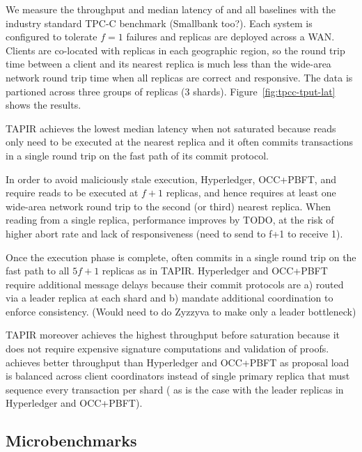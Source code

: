 We measure the throughput and median latency of \sys{} and all baselines with the
industry standard TPC-C benchmark (Smallbank too?). Each system is configured to tolerate $f=1$
failures and replicas are deployed across a WAN. Clients are co-located with
replicas in each geographic region, so the round trip time between a client and
its nearest replica is much less than the wide-area network round trip time when
all replicas are correct and responsive. The data is partioned across
three groups of replicas (3 shards). Figure~\ref{fig:tpcc-tput-lat} shows the results.

TAPIR achieves the lowest median latency when not saturated because reads only
need to be executed at the nearest replica and it often commits transactions in
a single round trip on the fast path of its commit protocol.

In order to avoid maliciously stale execution, Hyperledger, OCC+PBFT, and \sys{} require reads to be executed at $f+1$ replicas, and hence requires at least one wide-area network round trip
to the second (or third) nearest replica. When reading from a single replica, performance improves by TODO, at the risk of higher abort rate and lack of responsiveness (need to send to f+1 to receive 1).

Once the execution phase is complete,
\sys{} often commits in a single round trip on the fast path to all $5f+1$
replicas as in TAPIR. Hyperledger and OCC+PBFT require additional message delays
because their commit protocols are a) routed via a leader replica at each shard and b) mandate additional coordination to enforce consistency. (Would need to do Zyzzyva to make only a leader bottleneck)

TAPIR moreover achieves the highest throughput before saturation because it does not
require expensive signature computations and validation of proofs. \sys{} achieves
better throughput than Hyperledger and OCC+PBFT as proposal load is balanced across client coordinators instead of single primary replica that must sequence every transaction per shard ( as is the case with the leader replicas in Hyperledger
and OCC+PBFT). 


\subsection{Microbenchmarks}


